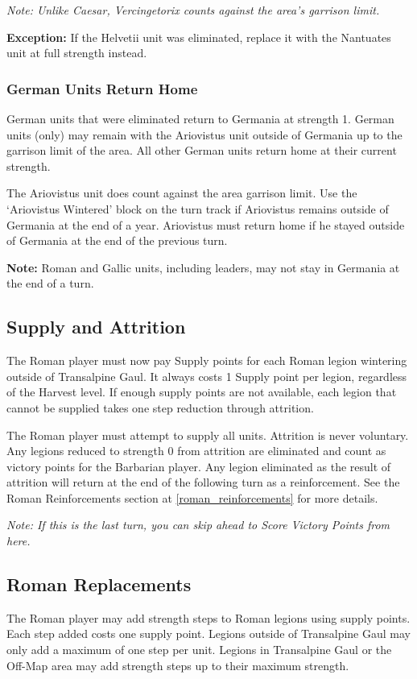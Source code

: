 \textit{Note: Unlike Caesar, Vercingetorix counts against the area's garrison limit.}

\textbf{Exception:} If the Helvetii unit was eliminated, replace it with the Nantuates unit at full strength instead.

\subsubsection{German Units Return Home}
\label{german_units_return_home}
\par
German units that were eliminated return to Germania at strength 1. German units (only) may remain with the Ariovistus unit outside of Germania up to the garrison limit of the area. All other German units return home at their current strength.

The Ariovistus unit does count against the area garrison limit. Use the ‘Ariovistus Wintered’ block on the turn track if Ariovistus remains outside of Germania at the end of a year. Ariovistus must return home if he stayed outside of Germania at the end of the previous turn.

\textbf{Note:} Roman and Gallic units, including leaders, may not stay in Germania at the end of a turn.

\subsection{Supply and Attrition}
\label{supply_and_attrition}
\par
The Roman player must now pay Supply points for each Roman legion wintering outside of Transalpine Gaul. It always costs 1 Supply point per legion, regardless of the Harvest level. If enough supply points are not available, each legion that cannot be supplied takes one step reduction through attrition.

The Roman player must attempt to supply all units. Attrition is never voluntary. Any legions reduced to strength 0 from attrition are eliminated and count as victory points for the Barbarian player. Any legion eliminated as the result of attrition will return at the end of the following turn as a reinforcement. See the Roman Reinforcements section at \ref{roman_reinforcements} for more details.

\textit{Note: If this is the last turn, you can skip ahead to Score Victory Points from here.}

\subsection{Roman Replacements}
\par
The Roman player may add strength steps to Roman legions using supply points. Each step added costs one supply point. Legions outside of Transalpine Gaul may only add a maximum of one step per unit. Legions in Transalpine Gaul or the Off-Map area may add strength steps up to their maximum strength.

